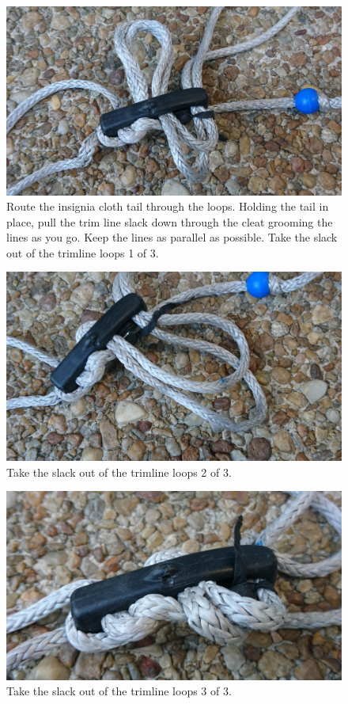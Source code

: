 \documentclass[
]{book}
\begin{document}
\begin{figure}

{\centering \includegraphics[width=0.7\linewidth]{images/threading_the_cleat_3} 

}

\caption{Route the insignia cloth tail through the loops. Holding the tail in place, pull the trim line slack down through the cleat grooming the lines as you go. Keep the lines as parallel as possible. Take the slack out of the trimline loops 1 of 3.}\label{fig:thread-cleat-3}
\end{figure}

\begin{figure}

{\centering \includegraphics[width=0.7\linewidth]{images/threading_the_cleat_4} 

}

\caption{Take the slack out of the trimline loops 2 of 3.}\label{fig:thread-cleat-4}
\end{figure}

\begin{figure}

{\centering \includegraphics[width=0.7\linewidth]{images/threading_the_cleat_5} 

}

\caption{Take the slack out of the trimline loops 3 of 3.}\label{fig:thread-cleat-5}
\end{figure}
\end{document}
